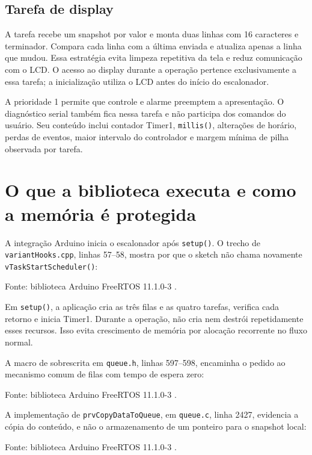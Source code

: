 \subsection{Tarefa de display}

A tarefa recebe um snapshot por valor e monta duas linhas com 16 caracteres e terminador. Compara cada linha com a última enviada e atualiza apenas a linha que mudou. Essa estratégia evita limpeza repetitiva da tela e reduz comunicação com o LCD. O acesso ao display durante a operação pertence exclusivamente a essa tarefa; a inicialização utiliza o LCD antes do início do escalonador.

A prioridade 1 permite que controle e alarme preemptem a apresentação. O diagnóstico serial também fica nessa tarefa e não participa dos comandos do usuário. Seu conteúdo inclui contador Timer1, \texttt{millis()}, alterações de horário, perdas de eventos, maior intervalo do controlador e margem mínima de pilha observada por tarefa.

\section{O que a biblioteca executa e como a memória é protegida}

A integração Arduino inicia o escalonador após \texttt{setup()}. O trecho de \texttt{variantHooks.cpp}, linhas 57–58, mostra por que o sketch não chama novamente \texttt{vTaskStartScheduler()}:


\noindent Fonte: biblioteca Arduino FreeRTOS 11.1.0-3 \autocite{fonte11}.

Em \texttt{setup()}, a aplicação cria as três filas e as quatro tarefas, verifica cada retorno e inicia Timer1. Durante a operação, não cria nem destrói repetidamente esses recursos. Isso evita crescimento de memória por alocação recorrente no fluxo normal.

A macro de sobrescrita em \texttt{queue.h}, linhas 597–598, encaminha o pedido ao mecanismo comum de filas com tempo de espera zero:


\noindent Fonte: biblioteca Arduino FreeRTOS 11.1.0-3 \autocite{fonte12}.

A implementação de \texttt{prvCopyDataToQueue}, em \texttt{queue.c}, linha 2427, evidencia a cópia do conteúdo, e não o armazenamento de um ponteiro para o snapshot local:


\noindent Fonte: biblioteca Arduino FreeRTOS 11.1.0-3 \autocite{fonte13}.

